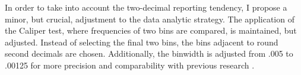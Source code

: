 In order to take into account the two-decimal reporting tendency, I propose a minor, but crucial, adjustment to the data analytic strategy. The application of the Caliper test, where frequencies of two bins are compared, is maintained, but adjusted. Instead of selecting the final two bins, the bins adjacent to round second decimals are chosen. Additionally, the binwidth is adjusted from .005 to .00125 for more precision and comparability with previous research \cite{Masicampo2012, Leggett2013}.